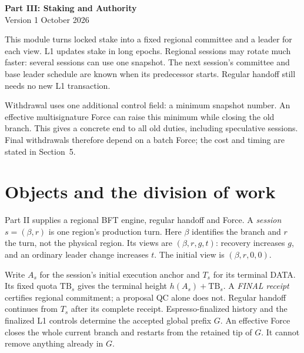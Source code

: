 \documentclass[11pt,a4paper]{article}
\begin{document}
\begin{center}
{\Large\bfseries Part III: Staking and Authority}\\[3pt]
{\small Version 1  October 2026}
\end{center}

This module turns locked stake into a fixed regional committee and a leader
for each view. L1 updates stake in long epochs. Regional sessions may rotate
much faster: several sessions can use one snapshot. The next session's
committee and base leader schedule are known when its predecessor starts.
Regular handoff still needs no new L1 transaction.

Withdrawal uses one additional control field: a minimum snapshot number.
An effective multisignature Force can raise this minimum while closing
the old branch. This gives a concrete end to all old duties, including
speculative sessions. Final withdrawals therefore depend on a batch Force;
the cost and timing are stated in Section~5.

\section{Objects and the division of work}
\label{sec:objects}
Part II supplies a regional BFT engine, regular handoff and Force. A
\emph{session} $s=(\beta,r)$ is one region's production turn. Here $\beta$
identifies the branch and $r$ the turn, not the physical region. Its views
are $(\beta,r,g,t)$: recovery increases $g$, and an ordinary leader change
increases $t$. The initial view is $(\beta,r,0,0)$.

Write $A_s$ for the session's initial execution anchor and $T_s$ for its
terminal DATA. Its fixed quota $\mathrm{TB}_s$ gives the terminal height
$h(A_s)+\mathrm{TB}_s$. A \emph{FINAL receipt} certifies regional commitment;
a proposal QC alone does not. Regular handoff continues from $T_s$ after
its complete receipt. Espresso-finalized history and the finalized L1
controls determine the accepted global prefix $G$. An effective Force
closes the whole current branch and restarts from the retained tip of $G$.
It cannot remove anything already in $G$.
\end{document}
